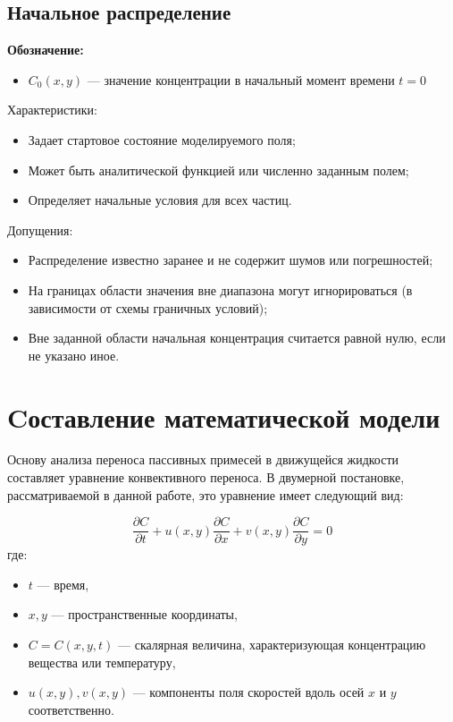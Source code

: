 \documentclass[a4paper,12pt]{article}
\begin{document}
\subsection{Начальное распределение}
\textbf{Обозначение:}  
\begin{itemize}
    \item $C_0(x, y)$ — значение концентрации в начальный момент времени $t = 0$
\end{itemize}
Характеристики:
\begin{itemize}
    \item Задает стартовое состояние моделируемого поля;
    \item Может быть аналитической функцией или численно заданным полем;
    \item Определяет начальные условия для всех частиц.
\end{itemize}
Допущения:
\begin{itemize}
    \item Распределение известно заранее и не содержит шумов или погрешностей;
    \item На границах области значения вне диапазона могут игнорироваться (в зависимости от схемы граничных условий);
    \item Вне заданной области начальная концентрация считается равной нулю, если не указано иное.
\end{itemize}


\newpage

\section{Cоставление математической модели}

Основу анализа переноса пассивных примесей в движущейся жидкости составляет уравнение конвективного переноса. В двумерной постановке, рассматриваемой в данной работе, это уравнение имеет следующий вид: 

$$
\frac{\partial C}{\partial t} + u(x,y)\frac{\partial C}{\partial x} + v(x,y)\frac{\partial C}{\partial y} = 0
$$
где:
\begin{itemize}
\item $t$ — время,
\item $x, y$ — пространственные координаты, 
\item $C = C(x,y,t)$ — скалярная величина, характеризующая концентрацию вещества или температуру,
\item $u(x,y), v(x,y)$ — компоненты поля скоростей вдоль осей $x$ и $y$ соответственно.
\end{itemize}
\end{document}
